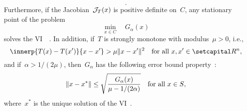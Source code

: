 \documentclass[../../main]{subfiles}
\begin{document}
\begin{example}
\begin{description}
\begin{equation}
            .\end{equation} 
            Furthermore, if the Jacobian~$\mathcal{J}_{T}(x)$ is positive definite on~$C$, any stationary point of the problem
            \begin{equation}
                \min_{x \in C} \quad G_\alpha(x)
            \end{equation} 
            solves the VI~~\cite{Fukushima1992}.
            In addition, if~$T$ is strongly monotone with modulus~$\mu > 0$, i.e.,
            \begin{equation}
                \innerp{T(x) - T(x')}{x - x'} > \mu \norm{x - x'}^2 \forallcondition{x, x' \in \setR^n}
            ,\end{equation}
            and if~$\alpha > 1 / (2 \mu)$, then~$G_\alpha$ has the following error bound property~\cite{Taji1993}:
            \begin{equation}
                \lVert x - x^\ast\rVert \le \sqrt{\frac{G_\alpha(x)}{\mu - 1 / (2 \alpha)}} \quad \text{for all~$x \in S$}
            ,\end{equation} 
            where~$x^\ast$ is the unique solution of the VI~.
    \end{description}
\end{example}
\end{document}
